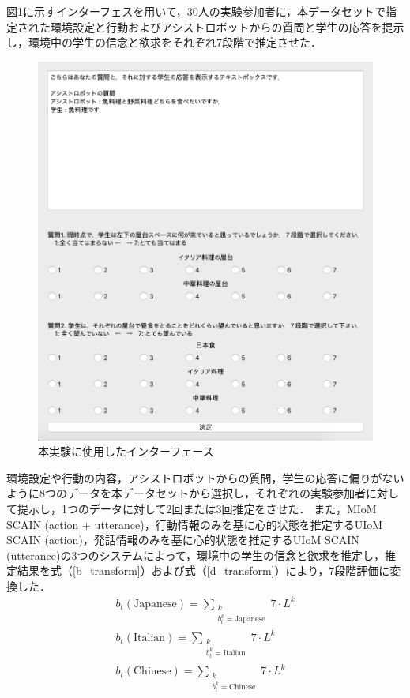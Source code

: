 \par
図\ref{fig:interface}に示すインターフェスを用いて，30人の実験参加者に，本データセットで指定された環境設定と行動およびアシストロボットからの質問と学生の応答を提示し，環境中の学生の信念と欲求をそれぞれ7段階で推定させた．
\begin{figure}[htbp]
  \begin{center}
    \includegraphics[scale=0.6]{./interface.pdf}
    \caption{本実験に使用したインターフェース}
    \label{fig:interface}
  \end{center}
\end{figure}
環境設定や行動の内容，アシストロボットからの質問，学生の応答に偏りがないように8つのデータを本データセットから選択し，それぞれの実験参加者に対して提示し，1つのデータに対して2回または3回推定をさせた．
また，MIoM SCAIN (action + utterance)，行動情報のみを基に心的状態を推定するUIoM SCAIN (action)，発話情報のみを基に心的状態を推定するUIoM SCAIN (utterance)の3つのシステムによって，環境中の学生の信念と欲求を推定し，推定結果を式（\ref{b_transform}）および式（\ref{d_transform}）により，7段階評価に変換した．
\begin{equation}
  \begin{split}
  \label{b_transform}
  b_t(\mathrm{Japanese})= \sum_{\substack{k\\b_t^k=\mathrm{Japanese}}} 7\cdot L^k\\
  b_t(\mathrm{Italian})=\sum_{\substack{k\\b_t^k=\mathrm{Italian}}} 7\cdot L^k\\
  b_t(\mathrm{Chinese})=\sum_{\substack{k\\b_t^k=\mathrm{Chinese}}} 7\cdot L^k\\
  \end{split}
\end{equation}


